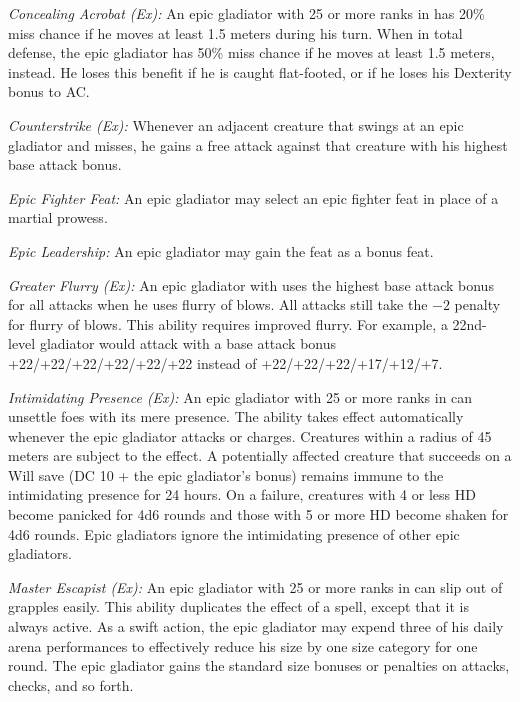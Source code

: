 \textit{Concealing Acrobat (Ex):} An epic gladiator with 25 or more ranks in  has 20\% miss chance if he moves at least 1.5 meters during his turn. When in total defense, the epic gladiator has 50\% miss chance if he moves at least 1.5 meters, instead. He loses this benefit if he is caught flat-footed, or if he loses his Dexterity bonus to AC.

\textit{Counterstrike (Ex):} Whenever an adjacent creature that swings at an epic gladiator and misses, he gains a free attack against that creature with his highest base attack bonus.

\textit{Epic Fighter Feat:} An epic gladiator may select an epic fighter feat in place of a martial prowess.

\textit{Epic Leadership:} An epic gladiator may gain the  feat as a bonus feat.


\textit{Greater Flurry (Ex):} An epic gladiator with uses the highest base attack bonus for all attacks when he uses flurry of blows. All attacks still take the $-2$ penalty for flurry of blows. This ability requires improved flurry. For example, a 22nd-level gladiator would attack with a base attack bonus +22/+22/+22/+22/+22/+22 instead of +22/+22/+22/+17/+12/+7.

\textit{Intimidating Presence (Ex):} An epic gladiator with 25 or more ranks in  can unsettle foes with its mere presence. The ability takes effect automatically whenever the epic gladiator attacks or charges. Creatures within a radius of 45 meters are subject to the effect. A potentially affected creature that succeeds on a Will save (DC 10 + the epic gladiator's  bonus) remains immune to the intimidating presence for 24 hours. On a failure, creatures with 4 or less HD become panicked for 4d6 rounds and those with 5 or more HD become shaken for 4d6 rounds. Epic gladiators ignore the intimidating presence of other epic gladiators.

\textit{Master Escapist (Ex):} An epic gladiator with 25 or more ranks in  can slip out of grapples easily. This ability duplicates the effect of a  spell, except that it is always active. As a swift action, the epic gladiator may expend three of his daily arena performances to effectively reduce his size by one size category for one round. The epic gladiator gains the standard size bonuses or penalties on attacks,  checks, and so forth.

